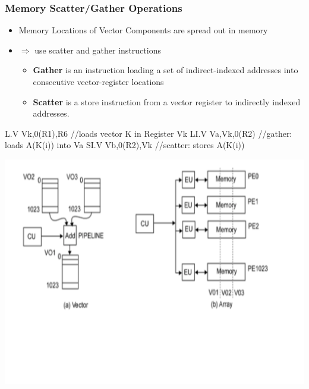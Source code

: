 \documentclass{beamer}
\newcommand{\emp}[1]{\textcolor{DikuRed}{ #1}}
\begin{document}
\begin{frame}[fragile,t]
\frametitle{Memory Scatter/Gather Operations}

\begin{itemize}
    \item Memory Locations of Vector Components are spread out in memory
    \item $\Rightarrow$ use scatter and gather instructions\medskip 
        \begin{itemize}
            \item \emp{\bf Gather} is an instruction loading a set of
                    indirect-indexed addresses into consecutive 
                    vector-register locations\smallskip
            \item \emp{\bf Scatter} is a store instruction from a vector
                    register to indirectly indexed addresses.
        \end  {itemize}
\end  {itemize}

\begin{colorcode}[fontsize=\scriptsize]
L.V   Vk,0(R1),R6  //loads vector K in Register Vk
LI.V  Va,Vk,0(R2)  //gather: loads A(K(i)) into Va
SI.V  Vb,0(R2),Vk  //scatter: stores A(K(i))
\end{colorcode}


\includegraphics[width=59ex]{Ch1Figs/VectorMachine}

\end{frame}
\end{document}
